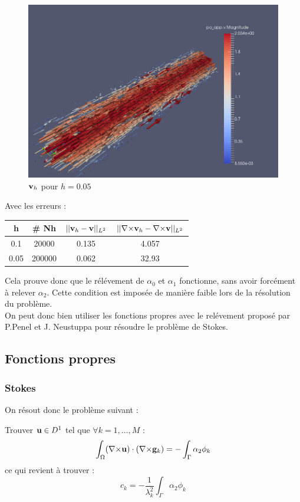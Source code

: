 \documentclass[a4paper,11pt]{article}
\begin{document}
\begin{figure}[H]
  \centering
  \includegraphics[scale=0.4]{vharrow}
  \caption{${\mathbf{v}}_h$ pour $h=0.05$}
\end{figure}

Avec les erreurs :
\begin{table}[H]
  \centering
  \begin{tabular}{c|c||c|c}
    h & \# Nh & $||{\mathbf{v}}_h-{\mathbf{v}}||_{L^2}$ & $||{\nabla\times}{\mathbf{v}}_h-{\nabla\times}{\mathbf{v}}||_{L^2}$ \\
    \hline
    0.1 & 20000 & 0.135 & 4.057\\
    0.05 & 200000 & 0.062 & 32.93
  \end{tabular}
\end{table}

Cela prouve donc que le rélévement de $\alpha_0$ et $\alpha_1$ fonctionne, sans avoir forcément à relever $\alpha_2$. Cette condition est imposée de manière faible lors de la résolution du problème.\\
On peut donc bien utiliser les fonctions propres avec le relévement proposé par P.Penel et J. Neustuppa pour résoudre le problème de Stokes.

\subsection{Fonctions propres}
\subsubsection{Stokes}
On résout donc le problème suivant :
\begin{pb}Trouver ${\mathbf{u}}\in D^1$ tel que $\forall k=1,\dots,M$ :
  \[ \int_\Omega({\nabla\times}{\mathbf{u}})\cdot({\nabla\times}{\mathbf{g}}_k) = - \int_\Gamma \alpha_2\phi_k \]
  ce qui revient à trouver :
  \[ c_k = -\frac{1}{\lambda_k^2}\int_\Gamma \alpha_2\phi_k \]
\end{pb}
\end{document}
